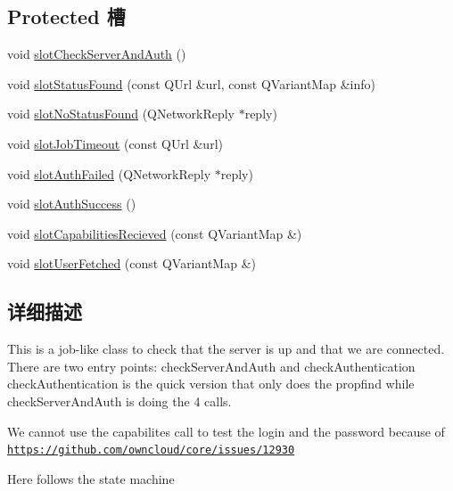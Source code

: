\subsection*{Protected 槽}
\begin{DoxyCompactItemize}
\item 
void \hyperlink{class_o_c_c_1_1_connection_validator_ab476680918dd038e6165c1aa8ba6e83b}{slot\+Check\+Server\+And\+Auth} ()
\item 
void \hyperlink{class_o_c_c_1_1_connection_validator_a453ed6ba3c6e443351206d678b05cc6d}{slot\+Status\+Found} (const Q\+Url \&url, const Q\+Variant\+Map \&info)
\item 
void \hyperlink{class_o_c_c_1_1_connection_validator_ae178ff61a965a319459e70e1cdadd8bb}{slot\+No\+Status\+Found} (Q\+Network\+Reply $\ast$reply)
\item 
void \hyperlink{class_o_c_c_1_1_connection_validator_a65fc93790b5f9dd642cf47dc5d3062d2}{slot\+Job\+Timeout} (const Q\+Url \&url)
\item 
void \hyperlink{class_o_c_c_1_1_connection_validator_a1ccc64e4984f4573df3d341e3fa3c6fd}{slot\+Auth\+Failed} (Q\+Network\+Reply $\ast$reply)
\item 
void \hyperlink{class_o_c_c_1_1_connection_validator_a5bd5df8536fafb783091a50bdd10207b}{slot\+Auth\+Success} ()
\item 
void \hyperlink{class_o_c_c_1_1_connection_validator_adb3b198498e66c3070fadba550052d9c}{slot\+Capabilities\+Recieved} (const Q\+Variant\+Map \&)
\item 
void \hyperlink{class_o_c_c_1_1_connection_validator_a1466f15e5893c34e68c29aad2cc65a57}{slot\+User\+Fetched} (const Q\+Variant\+Map \&)
\end{DoxyCompactItemize}


\subsection{详细描述}
This is a job-\/like class to check that the server is up and that we are connected. There are two entry points\+: check\+Server\+And\+Auth and check\+Authentication check\+Authentication is the quick version that only does the propfind while check\+Server\+And\+Auth is doing the 4 calls.

We cannot use the capabilites call to test the login and the password because of \href{https://github.com/owncloud/core/issues/12930}{\tt https\+://github.\+com/owncloud/core/issues/12930}

Here follows the state machine


